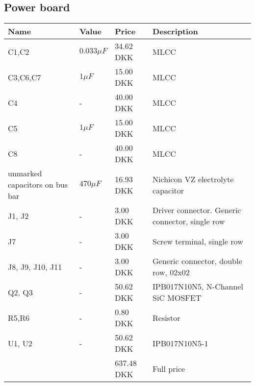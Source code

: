 \subsection{Power board}
\begin{table}[H]
\centering
\small
\begin{tabular}{|p{4cm} p{1.5cm} p{2.2cm} p{6cm}|} \hline
\textbf{Name}    & \textbf{Value} & \textbf{Price}
& \textbf{Description}                            \\ \hline
C1,C2            & $0.033\mu F$   & 34.62 DKK & MLCC                                            \\
C3,C6,C7         & $1\mu F$       & 15.00 DKK & MLCC                                            \\
C4               & -              & 40.00 DKK & MLCC                                            \\
C5               & $1\mu F$       & 15.00 DKK & MLCC                                            \\
C8               & -              & 40.00 DKK & MLCC                                            \\
unmarked capacitors on bus bar     & $470 \mu F$ & 16.93 DKK & Nichicon VZ electrolyte capacitor        \\
J1, J2           &  -             & 3.00 DKK & Driver connector. Generic connector, single row \\
J7               & -              & 3.00 DKK  & Screw terminal, single row                      \\
J8, J9, J10, J11 & -              & 3.00 DKK
& Generic connector, double row, 02x02            \\
Q2, Q3           & -              & 50.62 DKK
& IPB017N10N5, N-Channel SiC MOSFET               \\
R5,R6            & -              & 0.80 DKK
& Resistor                                        \\
U1, U2           & -              & 50.62 DKK
& IPB017N10N5-1 \\ \hline
&& 637.48 DKK & Full price \\ \hline
\end{tabular}
\end{table}

